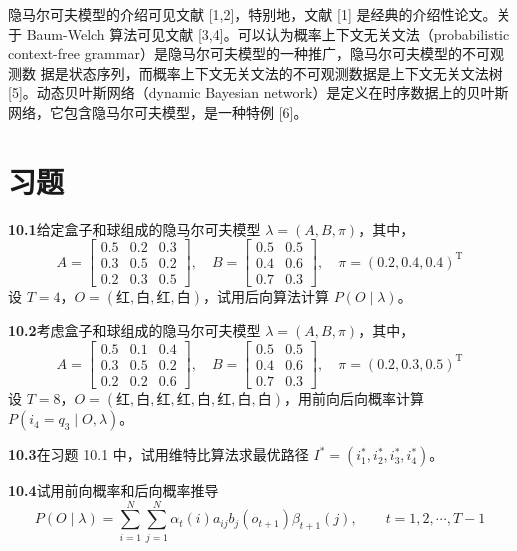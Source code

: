 \documentclass[UTF8,12pt,a4paper,fontset=fandol]{ctexart}
\begin{document}
隐马尔可夫模型的介绍可见文献 [1,2]，特别地，文献 [1] 是经典的介绍性论文。关于 Baum-Welch 算法可见文献 [3,4]。可以认为概率上下文无关文法（probabilistic context-free grammar）是隐马尔可夫模型的一种推广，隐马尔可夫模型的不可观测数
据是状态序列，而概率上下文无关文法的不可观测数据是上下文无关文法树 [5]。动态贝叶斯网络（dynamic Bayesian network）是定义在时序数据上的贝叶斯网络，它包含隐马尔可夫模型，是一种特例 [6]。

\section*{习题}

\noindent\textbf{10.1}\quad 给定盒子和球组成的隐马尔可夫模型 $\lambda=(A,B,\pi)$，其中，
\[
  A=
  \begin{bmatrix}
    0.5 & 0.2 & 0.3\\
    0.3 & 0.5 & 0.2\\
    0.2 & 0.3 & 0.5
  \end{bmatrix},
  \quad
  B=
  \begin{bmatrix}
    0.5 & 0.5\\
    0.4 & 0.6\\
    0.7 & 0.3
  \end{bmatrix},
  \quad
  \pi=(0.2,0.4,0.4)^{\mathrm T}
\]
设 $T=4$，$O=(\text{红},\text{白},\text{红},\text{白})$，试用后向算法计算 $P(O\mid\lambda)$。

\noindent\textbf{10.2}\quad 考虑盒子和球组成的隐马尔可夫模型 $\lambda=(A,B,\pi)$，其中，
\[
  A=
  \begin{bmatrix}
    0.5 & 0.1 & 0.4\\
    0.3 & 0.5 & 0.2\\
    0.2 & 0.2 & 0.6
  \end{bmatrix},
  \quad
  B=
  \begin{bmatrix}
    0.5 & 0.5\\
    0.4 & 0.6\\
    0.7 & 0.3
  \end{bmatrix},
  \quad
  \pi=(0.2,0.3,0.5)^{\mathrm T}
\]
设 $T=8$，$O=(\text{红},\text{白},\text{红},\text{红},\text{白},\text{红},\text{白},\text{白})$，用前向后向概率计算 $P(i_4=q_3\mid O,\lambda)$。

\noindent\textbf{10.3}\quad 在习题 10.1 中，试用维特比算法求最优路径 $I^*=(i_1^*,i_2^*,i_3^*,i_4^*)$。

\noindent\textbf{10.4}\quad 试用前向概率和后向概率推导
\[
  P(O\mid\lambda)=\sum_{i=1}^N\sum_{j=1}^N\alpha_t(i)a_{ij}b_j(o_{t+1})\beta_{t+1}(j),
  \qquad t=1,2,\cdots,T-1
\]
\end{document}
